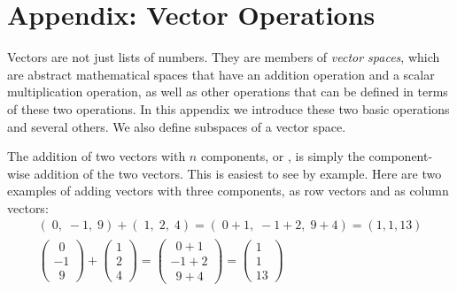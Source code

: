 
\section{Appendix: Vector Operations}\label{S:LinearAlgebraAppendix}


   Vectors are not just lists of numbers. They are members of \emph{vector 
spaces}, which are abstract mathematical spaces that have an addition operation 
and a scalar multiplication operation, as well as other operations that can be 
defined in terms of these two operations. In this appendix we introduce these 
two basic operations and several others. We also define subspaces of a vector
space.
   
   The addition of two vectors with $n$ components, or , is simply the component-wise addition of the two vectors. This is 
easiest to see by example. Here are two examples of adding vectors with three 
components, as row vectors and as column vectors:
\begin{eqnarray*}
 (\; 0,\; -1,\; 9) + (\; 1,\; 2,\; 4) = (\; 0+1,\; -1+2,\; 9+4) = (1, 1, 13) \\
\begin{pmatrix}
~~0 \\ -1 \\ ~~9
\end{pmatrix}
+
\begin{pmatrix}
1 \\ 2   \\ 4
\end{pmatrix}
=
\begin{pmatrix}
~~0+1 \\ -1+2 \\ ~~9 +4
\end{pmatrix}
=
\begin{pmatrix}
1 \\ 1 \\ 13
\end{pmatrix} \qquad  \qquad  \qquad 
\end{eqnarray*}

